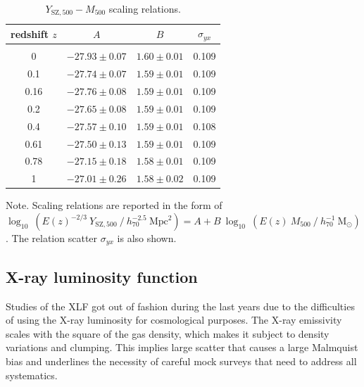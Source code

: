 \documentclass[traditabstract]{aa}
\newcommand{\rmn}{\mathrm}
\begin{document}
\begin{table}[t]
\begin{center}
\caption{$Y_{\rmn{SZ}, 500}-M_{500}$ scaling relations.}
\medskip
\begin{tabular}{cccc}
\hline\hline
\phantom{\Big|}
redshift $z$ & $A$ & $B$ & $\sigma_{yx}$ \\
\hline\\[-0.5em]
 0      & $-27.93\pm0.07$ & $1.60\pm0.01$ & 0.109\\
 0.1   & $-27.74\pm0.07$ & $1.59\pm0.01$ & 0.109\\
 0.16 & $-27.76\pm0.08$ & $1.59\pm0.01$ & 0.109\\
 0.2   & $-27.65\pm0.08$ & $1.59\pm0.01$ & 0.109\\ 
 0.4   & $-27.57\pm0.10$ & $1.59\pm0.01$ & 0.108\\ 
 0.61 & $-27.50\pm0.13$ & $1.59\pm0.01$ & 0.109\\ 
 0.78 & $-27.15\pm0.18$ & $1.58\pm0.01$ & 0.109\\ 
 1      & $-27.01\pm0.26$ & $1.58\pm0.02$ & 0.109\\[0.5em] 
\hline
\end{tabular}
\label{tab:YSZfits}
\end{center}
\footnotesize{Note. Scaling relations are reported in the form of $\log_{10}~(E(z)^{-2/3}~Y_{\rmn{SZ},500}~/~h_{70}^{-2.5}~\rmn{Mpc}^{2})=A+B~\log_{10}~(E(z)~M_{500}~/~h_{70}^{-1}~\rmn{M_{\odot}})$. The relation scatter $\sigma_{yx}$ is also shown.}
\end{table}



\subsection{X-ray luminosity function}

Studies of the XLF got out of fashion during the last years due to the
difficulties of using the X-ray luminosity for cosmological purposes. The X-ray
emissivity scales with the square of the gas density, which makes it subject to
density variations and clumping. This implies large scatter that causes a large
Malmquist bias and underlines the necessity of careful mock surveys that need to
address all systematics.
\end{document}
